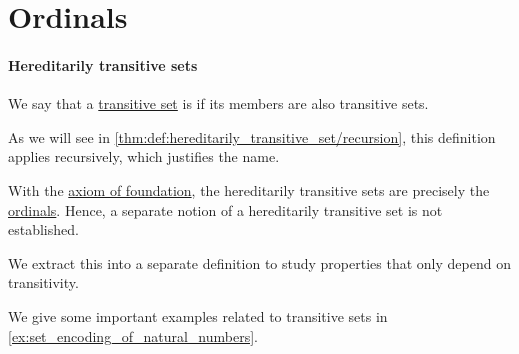 \section{Ordinals}\label{sec:ordinals}

\paragraph{Hereditarily transitive sets}

\begin{definition}\label{def:hereditarily_transitive_set}\mimprovised
  We say that a \hyperref[def:transitive_set]{transitive set} is  if its members are also transitive sets.
\end{definition}
\begin{comments}
  \item As we will see in \cref{thm:def:hereditarily_transitive_set/recursion}, this definition applies recursively, which justifies the name.

  \item With the \hyperref[def:zfc/foundation]{axiom of foundation}, the hereditarily transitive sets are precisely the \hyperref[def:ordinal]{ordinals}. Hence, a separate notion of a hereditarily transitive set is not established.

  We extract this into a separate definition to study properties that only depend on transitivity.

  \item We give some important examples related to transitive sets in \cref{ex:set_encoding_of_natural_numbers}.
\end{comments}

